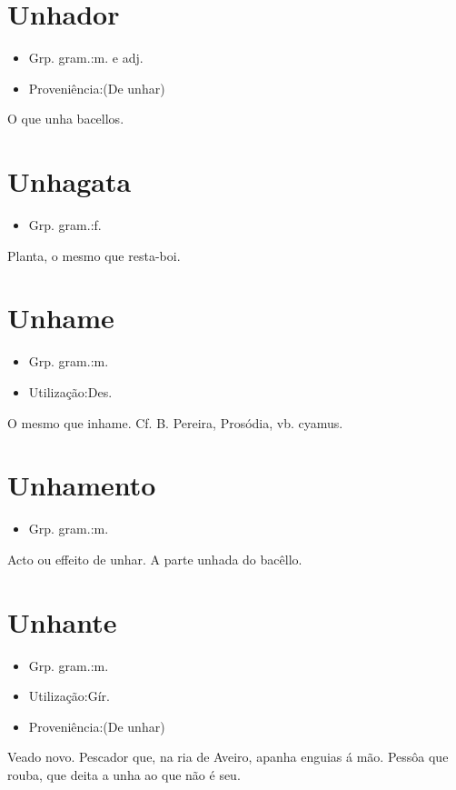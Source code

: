 \documentclass{article}
\begin{document}
\section{Unhador}
\begin{itemize}
\item {Grp. gram.:m.  e  adj.}
\end{itemize}
\begin{itemize}
\item {Proveniência:(De \textunderscore unhar\textunderscore )}
\end{itemize}
O que unha bacellos.
\section{Unhagata}
\begin{itemize}
\item {Grp. gram.:f.}
\end{itemize}
Planta, o mesmo que \textunderscore resta-boi\textunderscore .
\section{Unhame}
\begin{itemize}
\item {Grp. gram.:m.}
\end{itemize}
\begin{itemize}
\item {Utilização:Des.}
\end{itemize}
O mesmo que \textunderscore inhame\textunderscore . Cf. B. Pereira, \textunderscore Prosódia\textunderscore , vb. \textunderscore cyamus\textunderscore .
\section{Unhamento}
\begin{itemize}
\item {Grp. gram.:m.}
\end{itemize}
Acto ou effeito de unhar.
A parte unhada do bacêllo.
\section{Unhante}
\begin{itemize}
\item {Grp. gram.:m.}
\end{itemize}
\begin{itemize}
\item {Utilização:Gír.}
\end{itemize}
\begin{itemize}
\item {Proveniência:(De \textunderscore unhar\textunderscore )}
\end{itemize}
Veado novo.
Pescador que, na ria de Aveiro, apanha enguias á mão.
Pessôa que rouba, que deita a unha ao que não é seu.
\end{document}

